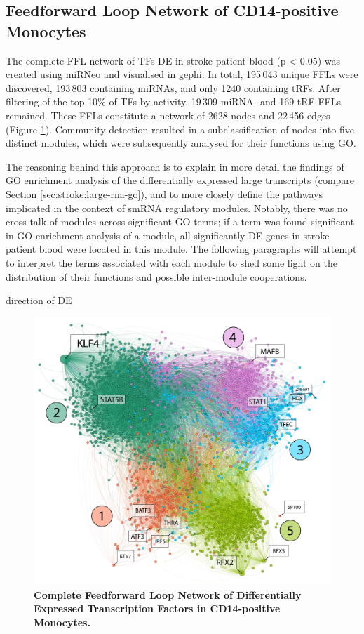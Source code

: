 \subsection{Feedforward Loop Network of CD14-positive Monocytes}
The complete FFL network of TFs DE in stroke patient blood (p < 0.05) was created using miRNeo and visualised in gephi. In total, 195\,043 unique FFLs were discovered, 193\,803 containing miRNAs, and only 1240 containing tRFs. After filtering of the top 10\% of TFs by activity, 19\,309 miRNA- and 169 tRF-FFLs remained. These FFLs constitute a network of 2628 nodes and 22\,456 edges (Figure \ref{fig:cd14-ffl-modules}). Community detection\cite{Blondel2008} resulted in a subclassification of nodes into five distinct modules, which were subsequently analysed for their functions using GO.

The reasoning behind this approach is to explain in more detail the findings of GO enrichment analysis of the differentially expressed large transcripts (compare Section \ref{sec:stroke:large-rna-go}), and to more closely define the pathways implicated in the context of smRNA regulatory modules. Notably, there was no cross-talk of modules across significant GO terms; if a term was found significant in GO enrichment analysis of a module, all significantly DE genes in stroke patient blood were located in this module. The following paragraphs will attempt to interpret the terms associated with each module to shed some light on the distribution of their functions and possible inter-module cooperations.

direction of DE



\begin{figure}
\includegraphics[width=\textwidth]{figures/cd14-ffl-modules}
\caption[Complete Feedforward Loop Network of Differentially Expressed Transcription Factors in CD14-positive Monocytes.]{\textbf{Complete Feedforward Loop Network of Differentially Expressed Transcription Factors in CD14-positive Monocytes.} 
\label{fig:cd14-ffl-modules}}
\end{figure}

